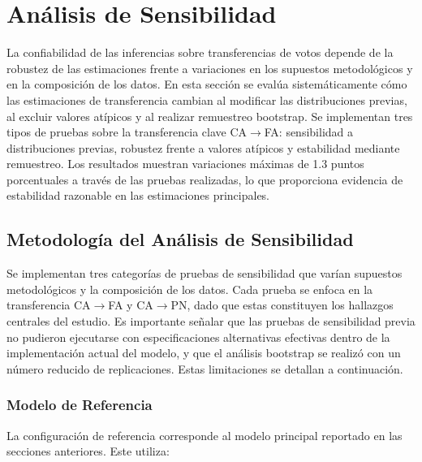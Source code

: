 
\section{Análisis de Sensibilidad}
\label{sec:sensibilidad}

La confiabilidad de las inferencias sobre transferencias de votos depende de la robustez de las estimaciones frente a variaciones en los supuestos metodológicos y en la composición de los datos. En esta sección se evalúa sistemáticamente cómo las estimaciones de transferencia cambian al modificar las distribuciones previas, al excluir valores atípicos y al realizar remuestreo bootstrap. Se implementan tres tipos de pruebas sobre la transferencia clave CA$\to$FA: sensibilidad a distribuciones previas, robustez frente a valores atípicos y estabilidad mediante remuestreo. Los resultados muestran variaciones máximas de 1.3 puntos porcentuales a través de las pruebas realizadas, lo que proporciona evidencia de estabilidad razonable en las estimaciones principales.

\subsection{Metodología del Análisis de Sensibilidad}
\label{sec:sensibilidad_metodologia}

Se implementan tres categorías de pruebas de sensibilidad que varían supuestos metodológicos y la composición de los datos. Cada prueba se enfoca en la transferencia CA$\to$FA y CA$\to$PN, dado que estas constituyen los hallazgos centrales del estudio. Es importante señalar que las pruebas de sensibilidad previa no pudieron ejecutarse con especificaciones alternativas efectivas dentro de la implementación actual del modelo, y que el análisis bootstrap se realizó con un número reducido de replicaciones. Estas limitaciones se detallan a continuación.

\subsubsection{Modelo de Referencia}

La configuración de referencia corresponde al modelo principal reportado en las secciones anteriores. Este utiliza:

